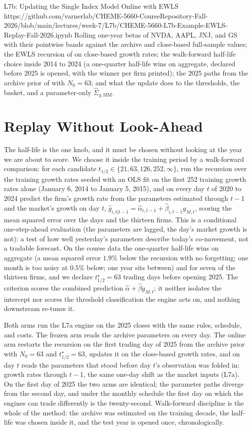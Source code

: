\documentclass[11pt]{article}
\newcommand{\SigSIM}{\hat\Sigma_{g,\mathrm{SIM}}}
\newcommand{\thalf}{t_{1/2}}
\begin{document}
\notebooklink
  {L7b: Updating the Single Index Model Online with EWLS}
  {https://github.com/varnerlab/CHEME-5660-CourseRepository-Fall-2026/blob/main/lectures/week-7/L7b/CHEME-5660-L7b-Example-EWLS-Replay-Fall-2026.ipynb}
  {Rolling one-year betas of NVDA, AAPL, JNJ, and GS with their pointwise bands against the archive and close-based full-sample values; the EWLS recursion of  on close-based growth rates; the walk-forward half-life choice inside 2014 to 2024 (a one-quarter half-life wins on aggregate, declared before 2025 is opened, with the winner per firm printed); the 2025 paths from the archive prior of  with $N_0=63$; and what the update does to the thresholds, the basket, and a parameter-only $\SigSIM$.}

\section{Replay Without Look-Ahead}

The half-life is the one knob, and it must be chosen without looking at the year we are about to score. We choose it inside the training period by a walk-forward comparison: for each candidate $\thalf\in\{21,63,126,252,\infty\}$, run the recursion over the training growth rates seeded with an OLS fit on the first 252 training growth rates alone (January 6, 2014 to January 5, 2015), and on every day $t$ of 2020 to 2024 predict the firm's growth rate from the parameters estimated through $t-1$ and the market's growth on day $t$, $\hat g_{i,t|t-1}=\hat\alpha_{i,t-1}+\hat\beta_{i,t-1}g_{M,t}$, scoring the mean squared error over the days and the thirteen firms. This is a conditional one-step-ahead evaluation (the parameters are lagged, the day's market growth is not): a test of how well yesterday's parameters describe today's co-movement, not a tradable forecast. On the course data the one-quarter half-life wins on aggregate (a mean squared error $1.9\%$ below the recursion with no forgetting; one month is too noisy at $0.5\%$ below; one year sits between) and for seven of the thirteen firms, and we declare $\thalf^\star=63$ trading days before opening 2025. The criterion scores the combined prediction $\hat\alpha+\hat\beta g_{M,t}$; it neither isolates the intercept nor scores the threshold classification the engine acts on, and nothing downstream re-tunes it.

Both arms run the L7a engine on the 2025 closes with the same rules, schedule, and costs. The frozen arm reads the archive parameters on every day. The online arm restarts the recursion on the first trading day of 2025 from the archive prior with $N_0=63$ and $\thalf^\star=63$, updates it on the close-based growth rates, and on day $t$ reads the parameters that stood before day $t$'s observation was folded in: growth rates through $t-1$, the same one-day shift as the market inputs (L7a). On the first day of 2025 the two arms are identical; the parameter paths diverge from the second day, and under the monthly schedule the first day on which the engines can trade differently is the twenty-second. Walk-forward discipline is the whole of the method: the archive was estimated on the training decade, the half-life was chosen inside it, and the test year is opened once, chronologically.
\end{document}
